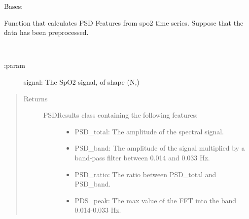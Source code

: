 \documentclass[letterpaper,10pt,english]{sphinxmanual}
\begin{document}

\begin{fulllineitems}
\label{\detokenize{OBM:OBM.PeriodicityMeasures.PSDMeasures}}
Bases: 

Function that calculates PSD Features from spo2 time series.
Suppose that the data has been preprocessed.

\begin{fulllineitems}
\label{\detokenize{OBM:OBM.PeriodicityMeasures.PSDMeasures.compute}}~\begin{description}
\item[{:param}] \leavevmode
signal: The SpO2 signal, of shape (N,)

\end{description}
\begin{quote}\begin{description}
\item[{Returns}] \leavevmode
\begin{description}
\item[{PSDResults class containing the following features:}] \leavevmode\begin{itemize}
\item {} 
PSD\_total: The amplitude of the spectral signal.

\item {} 
PSD\_band: The amplitude of the signal multiplied by a band-pass filter between 0.014 and 0.033 Hz.

\item {} 
PSD\_ratio: The ratio between PSD\_total and PSD\_band.

\item {} 
PDS\_peak: The max value of the FFT into the band 0.014-0.033 Hz.

\end{itemize}

\end{description}


\end{description}\end{quote}

\end{fulllineitems}


\end{fulllineitems}
\end{document}

